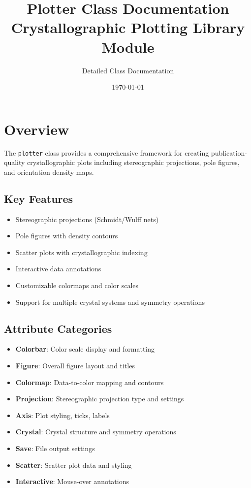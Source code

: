 \documentclass[11pt,a4paper]{article}
\title{\textbf{Plotter Class Documentation}\\
\large Crystallographic Plotting Library Module}
\author{Detailed Class Documentation}
\date{\today}
\begin{document}
\maketitle
\tableofcontents
\newpage

\section{Overview}

The \texttt{plotter} class provides a comprehensive framework for creating publication-quality crystallographic plots including stereographic projections, pole figures, and orientation density maps.

\subsection{Key Features}
\begin{itemize}[leftmargin=*]
    \item Stereographic projections (Schmidt/Wulff nets)
    \item Pole figures with density contours
    \item Scatter plots with crystallographic indexing
    \item Interactive data annotations
    \item Customizable colormaps and color scales
    \item Support for multiple crystal systems and symmetry operations
\end{itemize}

\subsection{Attribute Categories}
\begin{itemize}[leftmargin=*]
    \item \textbf{Colorbar}: Color scale display and formatting
    \item \textbf{Figure}: Overall figure layout and titles
    \item \textbf{Colormap}: Data-to-color mapping and contours
    \item \textbf{Projection}: Stereographic projection type and settings
    \item \textbf{Axis}: Plot styling, ticks, labels
    \item \textbf{Crystal}: Crystal structure and symmetry operations
    \item \textbf{Save}: File output settings
    \item \textbf{Scatter}: Scatter plot data and styling
    \item \textbf{Interactive}: Mouse-over annotations
\end{itemize}
\end{document}
